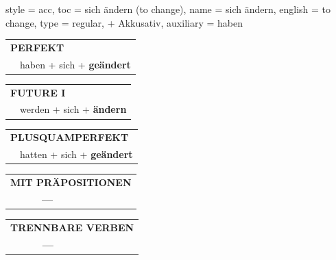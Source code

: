 \begin{verbentry}{
  style = {acc},
  toc = {sich ändern (to change)},
  name = {sich ändern},
  english = {to change},
  type = {regular, + Akkusativ},
  auxiliary = {haben}
}
    \vspace{10pt}

 \begin{tabular}{rl}
     \multicolumn{2}{l}{\textbf{PERFEKT}}\\
    &haben + sich + \textbf{geändert}\\
  \end{tabular}
\hfill
   \begin{tabular}{rl}
   
    \multicolumn{2}{l}{\textbf{FUTURE I} }\\
    &werden + sich + \textbf{ändern}\\
 
  \end{tabular}
\hfill
   \begin{tabular}{rl}
      \multicolumn{2}{l}{\textbf{PLUSQUAMPERFEKT}}\\
    &hatten + sich + \textbf{geändert}\\
  \end{tabular}
  
  
\vspace{10pt}

\begin{tabular}{lll}
\multicolumn{3}{l}{\textbf{MIT PRÄPOSITIONEN}}\\
& \textbf{---} & \\
\end{tabular}
\hfill
\begin{tabular}{lll}
\multicolumn{3}{l}{\textbf{TRENNBARE VERBEN}}\\
& \textbf{---} & \\
\end{tabular}

\vspace{-5pt}
\end{verbentry}

